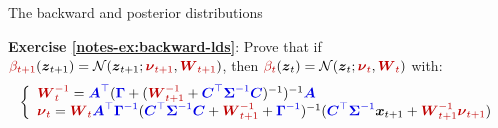 \documentclass{beamer}
\newcommand{\MN}{{\mathcal N}}
\newcommand{\bs}[1]{\boldsymbol{#1}}
\newcommand{\exercise}[2]{\noindent\colorbox{blue!10}{\parbox{0.995\textwidth}{\textbf{Exercise \ref{notes-ex:#1}}: #2}}\\}
\newcommand{\paint}[2]{{\color{#1}#2}}
\begin{document}
\begin{frame}{The backward and posterior distributions}
\exercise{backward-lds}{Prove that if $\paint{myred}{\beta_{t+1}}(\bs{z}_{t+1})={\cal N}(\bs{z}_{t+1};\paint{myred}{\boldsymbol{\nu}_{t+1}},\paint{myred}{\bs{W}_{t+1}})$, then $\paint{myred}{\beta_t}(\bs{z}_t) = {\cal N}(\bs{z}_t;\paint{myred}{\boldsymbol{\nu}_t},\paint{myred}{\bs{W}_t})$ with:
{\small\begin{equation*}
\left\{\begin{array}{l}  \paint{myred}{\bs{W}_t^{-1}} = \paint{myblue}{\bs{A}^\top}(\paint{myblue}{\bs{\Gamma}} + (\paint{myred}{\bs{W}_{t+1}^{-1}} + \paint{myblue}{\bs{C}^\top\bs{\Sigma}^{-1}\bs{C}})^{-1})^{-1}\paint{myblue}{\bs{A}}\\
\paint{myred}{\boldsymbol{\nu}_t} = \paint{myred}{\bs{W}_t} \paint{myblue}{\bs{A}^\top\bs{\Gamma}^{-1}}(\paint{myblue}{\bs{C}^\top\bs{\Sigma}^{-1}\bs{C}} + \paint{myred}{\bs{W}_{t+1}^{-1}} + \paint{myblue}{\bs{\Gamma}^{-1}})^{-1} ( \paint{myblue}{\bs{C}^\top\bs{\Sigma}^{-1}}\bs{x}_{t+1} + \paint{myred}{\bs{W}_{t+1}^{-1}\boldsymbol{\nu}_{t+1}})
\end{array}\right.
\end{equation*}}
}\vspace{2mm}


\end{frame}
\end{document}
